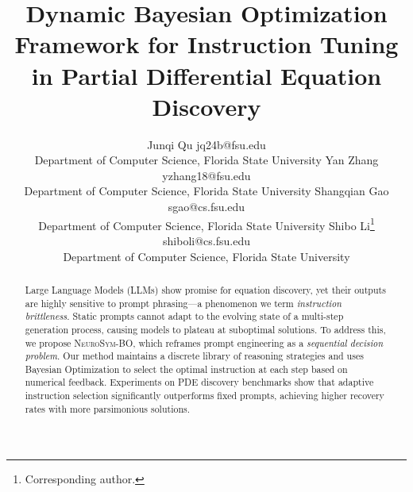 \documentclass[twoside,11pt]{article}
\newcommand{\ours}{\textsc{NeuroSym-BO}\xspace}
\newcommand{\1}{{\bf 1}}
\newcommand{\0}{{\bf 0}}
\begin{document}
\title{Dynamic Bayesian Optimization Framework for Instruction Tuning in Partial Differential Equation Discovery}



\author{
\name Junqi Qu \email jq24b@fsu.edu \\
\addr Department of Computer Science, Florida State University
\AND
\name Yan Zhang \email yzhang18@fsu.edu \\
\addr Department of Computer Science, Florida State University
\AND
\name Shangqian Gao \email sgao@cs.fsu.edu \\
\addr Department of Computer Science, Florida State University
\AND
\name Shibo Li\thanks{Corresponding author.} \email shiboli@cs.fsu.edu \\
\addr Department of Computer Science, Florida State University
}


\begingroup
\renewcommand\thefootnote{\fnsymbol{footnote}} 
\maketitle
\endgroup



\begin{abstract}
	Large Language Models (LLMs) show promise for equation discovery, yet their outputs are highly sensitive to prompt phrasing—a phenomenon we term \textit{instruction brittleness}. Static prompts cannot adapt to the evolving state of a multi-step generation process, causing models to plateau at suboptimal solutions. To address this, we propose \textsc{NeuroSym-BO}, which reframes prompt engineering as a \textit{sequential decision problem}. Our method maintains a discrete library of reasoning strategies and uses Bayesian Optimization to select the optimal instruction at each step based on numerical feedback. Experiments on PDE discovery benchmarks show that adaptive instruction selection significantly outperforms fixed prompts, achieving higher recovery rates with more parsimonious solutions.
\end{abstract}
\end{document}
